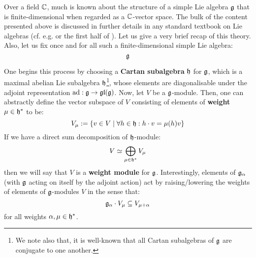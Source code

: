         Over a field $\mathbb{C}$, much is known about the structure of a simple Lie algebra $\mathfrak{g}$ that is finite-dimensional when regarded as a $\mathbb{C}$-vector space. The bulk of the content presented above is discussed in further details in any standard textbook on Lie algebras (cf. e.g. \cite{humphreys_lie_algebras} or the first half of \cite{carter_affine_lie_algebras}). Let us give a very brief recap of this theory. Also, let us fix once and for all such a finite-dimensional simple Lie algebra:
            $$\mathfrak{g}$$

        One begins this process by choosing a \textbf{Cartan subalgebra} $\mathfrak{h}$ for $\mathfrak{g}$, which is a maximal abelian Lie subalgebra $\mathfrak{h}$\footnote{We note also that, it is well-known that all Cartan subalgebras of $\mathfrak{g}$ are conjugate to one another.}, whose elements are diagonalisable under the adjoint representation $\mathrm{ad}: \mathfrak{g} \to \mathfrak{gl}(\mathfrak{g})$. Now, let $V$ be a $\mathfrak{g}$-module. Then, one can abstractly define the vector subspace of $V$ consisting of elements of \textbf{weight} $\mu \in \mathfrak{h}^*$ to be:
            $$V_{\mu} := \{v \in V \mid \forall h \in \mathfrak{h}: h \cdot v = \mu(h) v\}$$
        If we have a direct sum decomposition of $\mathfrak{h}$-module:
            $$V \simeq \bigoplus_{\mu \in \mathfrak{h}^*} V_{\mu}$$
        then we will say that $V$ is a \textbf{weight module} for $\mathfrak{g}$. Interestingly, elements of $\mathfrak{g}_{\alpha}$ (with $\mathfrak{g}$ acting on itself by the adjoint action) act by raising/lowering the weights of elements of $\mathfrak{g}$-modules $V$ in the sense that:
            $$\mathfrak{g}_{\alpha} \cdot V_{\mu} \subseteq V_{\mu + \alpha}$$
        for all weights $\alpha, \mu \in \mathfrak{h}^*$. 
        
